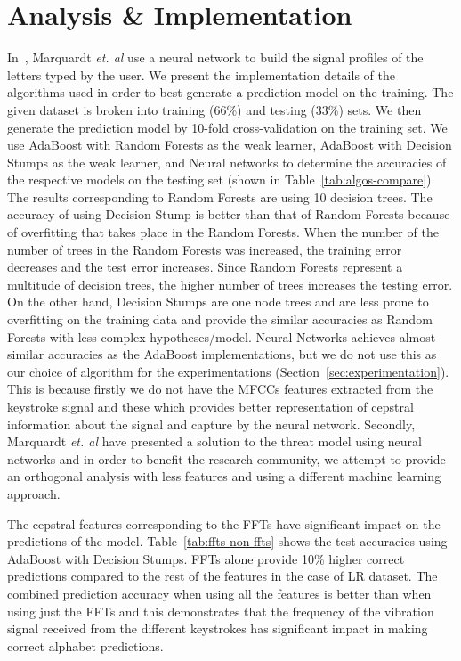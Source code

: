 \documentclass[11pt,conference]{IEEEtran}
\begin{document}
\section{Analysis \& Implementation}
\label{sec:implementation}
\noindent In~\cite{spiphone}, Marquardt \emph{et. al} use a neural network to build the signal profiles of the letters typed by the user. We present the implementation details of the algorithms used in order to best generate a prediction model on the training. The given dataset is broken into training (66\%) and testing (33\%) sets. We then generate the prediction model by 10-fold cross-validation on the training set. We use AdaBoost with Random Forests as the weak learner, AdaBoost with Decision Stumps as the weak learner, and Neural networks to determine the accuracies of the respective models on the testing set (shown in Table~\ref{tab:algos-compare}). The results corresponding to Random Forests are using 10 decision trees. The accuracy of using Decision Stump is better than that of Random Forests because of overfitting that takes place in the Random Forests. When the number of the number of trees in the Random Forests was increased, the training error decreases and the test error increases. Since Random Forests represent a multitude of decision trees, the higher number of trees increases the testing error. On the other hand, Decision Stumps are one node trees and are less prone to overfitting on the training data and provide the similar accuracies as Random Forests with less complex hypotheses/model. Neural Networks achieves almost similar accuracies as the AdaBoost implementations, but we do not use this as our choice of algorithm for the experimentations (Section~\ref{sec:experimentation}). This is because firstly we do not have the MFCCs features extracted from the keystroke signal and these which provides better representation of cepstral information about the signal and capture by the neural network. Secondly, Marquardt \emph{et. al} have presented a solution to the threat model using neural networks and in order to benefit the research community, we attempt to provide an orthogonal analysis with less features and using a different machine learning approach.

The cepstral features corresponding to the FFTs have significant impact on the predictions of the model. Table~\ref{tab:ffts-non-ffts} shows the test accuracies using AdaBoost with Decision Stumps. FFTs alone provide 10\% higher correct predictions compared to the rest of the features in the case of LR dataset. The combined prediction accuracy when using all the features is better than when using just the FFTs and this demonstrates that the frequency of the vibration signal received from the different keystrokes has significant impact in making correct alphabet predictions.
\end{document}
